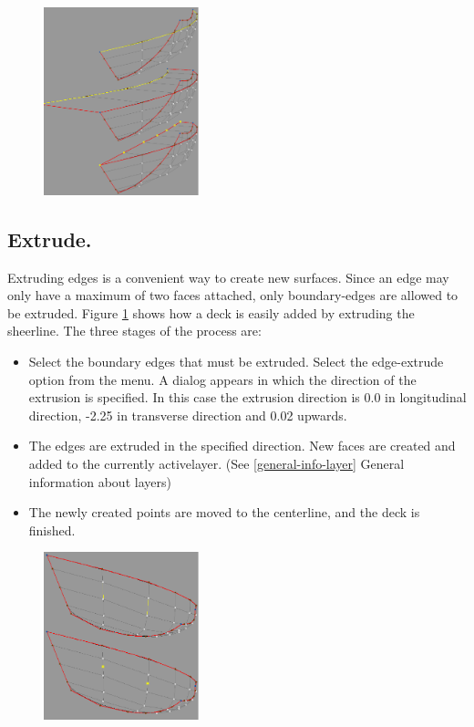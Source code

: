 \documentclass[12pt]{article}
\begin{document}
\begin{figure}
        \centering
        \includegraphics[width=0.4\textwidth,natwidth=426,natheight=517]{edgeextrude.png}
        \caption{}
        \label{fig:edgeextrude}
\end{figure}

\subsection{Extrude.}
Extruding edges is a convenient way to create new surfaces.  Since an
edge may only have a maximum of two faces attached, only
boundary-edges are allowed to be extruded.
Figure \ref{fig:edgeextrude} shows how a deck is easily added by
extruding the sheerline. The three stages of the process are:

\begin{itemize}

\item Select the boundary edges that must be extruded.
Select the edge-extrude option from the menu. A
dialog appears in which the direction of the extrusion is
specified. In this case the extrusion direction is 0.0 in
longitudinal direction, -2.25 in transverse direction and
0.02 upwards.

\item The edges are extruded in the specified direction. New
faces are created and added to the currently activelayer. (See \ref{general-info-layer}
General information about layers)


\item The newly created points are moved to the centerline, and the deck is finished.

\end{itemize}

\begin{figure}
        \centering
        \includegraphics[width=0.4\textwidth,natwidth=449,natheight=487]{edgesplit.png}
        \caption{}
        \label{fig:edgesplit}
\end{figure}
\end{document}
